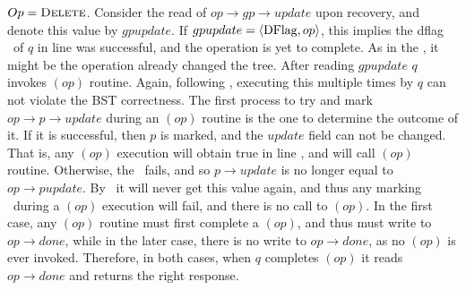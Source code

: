 $Op = \mbox{\sc Delete}$. Consider the read of $op\rightarrow gp\rightarrow update$ upon recovery, and denote this value by $gpupdate$. If $gpupdate = \langle \mbox{DFlag}, op \rangle$, this implies the dflag \CASB\ of $q$ in line  was successful, and the operation is yet to complete. As in the , it might be the operation already changed the tree. After reading $gpupdate$ $q$ invokes $(op)$ routine. Again, following \argAnonymous, executing this multiple times by $q$ can not violate the BST correctness.
The first process to try and mark $op\rightarrow p\rightarrow update$ during an $(op)$ routine is the one to determine the outcome of it. If it is successful, then $p$ is marked, and the $update$ field can not be changed. That is, any $(op)$ execution will obtain true in line , and will call $(op)$ routine. Otherwise, the \CASB\ fails, and so $p\rightarrow update$ is no longer equal to $op\rightarrow pupdate$. By \argNodeUpdate\ it will never get this value again, and thus any marking \CASB\ during a $(op)$ execution will fail, and there is no call to $(op)$. In the first case, any $(op)$ routine must first complete a $(op)$, and thus must write to $op\rightarrow done$, while in the later case, there is no write to $op\rightarrow done$, as no $(op)$ is ever invoked. Therefore, in both cases, when $q$ completes $(op)$ it reads $op\rightarrow done$ and returns the right response.


